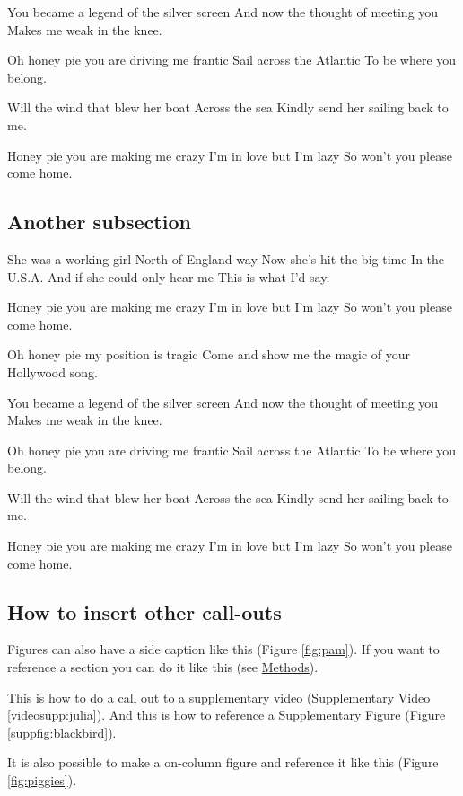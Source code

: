 You became a legend of the silver screen
And now the thought of meeting you
Makes me weak in the knee.

Oh honey pie you are driving me frantic
Sail across the Atlantic
To be where you belong.

Will the wind that blew her boat 
Across the sea
Kindly send her sailing back to me.

Honey pie you are making me crazy
I'm in love but I'm lazy
So won't you please come home.

\subsection*{Another subsection}

She was a working girl
North of England way
Now she's hit the big time
In the U.S.A.
And if she could only hear me
This is what I'd say.

Honey pie you are making me crazy 
I'm in love but I'm lazy
So won't you please come home.

Oh honey pie my position is tragic
Come and show me the magic
of your Hollywood song.

You became a legend of the silver screen
And now the thought of meeting you
Makes me weak in the knee.

Oh honey pie you are driving me frantic
Sail across the Atlantic
To be where you belong.

Will the wind that blew her boat 
Across the sea
Kindly send her sailing back to me.

Honey pie you are making me crazy
I'm in love but I'm lazy
So won't you please come home.

\subsection*{How to insert other call-outs}
Figures can also have a side caption like this (Figure \ref{fig:pam}).
If you want to reference a section you can do it like this (see \hyperref[s:methods]{Methods}).

This is how to do a call out to a supplementary video (Supplementary Video \ref{videosupp:julia}).
And this is how to reference a Supplementary Figure (Figure \ref{suppfig:blackbird}).

It is also possible to make a on-column figure and reference it like this (Figure \ref{fig:piggies}).

